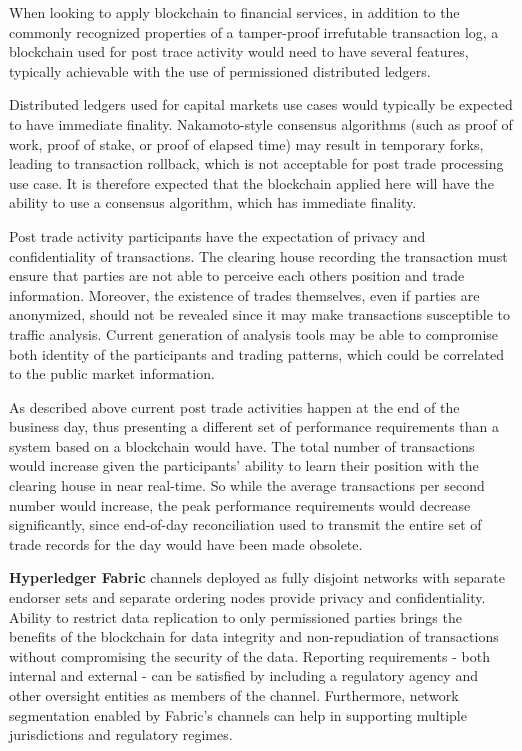 When looking to apply blockchain to financial services, in addition to the commonly recognized properties of a tamper-proof irrefutable transaction log, a blockchain used for post trace activity would need to have several features, typically achievable with the use of permissioned distributed ledgers.

Distributed ledgers used for capital markets use cases would typically be expected to have immediate finality. Nakamoto-style consensus algorithms (such as proof of work, proof of stake, or proof of elapsed time) may result in temporary forks, leading to transaction rollback, which is not acceptable for post trade processing use case. It is therefore expected that the blockchain applied here will have the ability to use a consensus algorithm, which has immediate finality.

Post trade activity participants have the expectation of privacy and confidentiality of transactions. The clearing house recording the transaction must ensure that parties are not able to perceive each others position and trade information. Moreover, the existence of trades themselves, even if parties are anonymized, should not be revealed since it may make transactions susceptible to traffic analysis. Current generation of analysis tools may be able to compromise both identity of the participants and trading patterns, which could be correlated to the public market information.

As described above current post trade activities happen at the end of the business day, thus presenting a different set of performance requirements than a system based on a blockchain would have. The total number of transactions would increase given the participants' ability to learn their position with the clearing house in near real-time. So while the average transactions per second number would increase, the peak performance requirements would decrease significantly, since end-of-day reconciliation used to transmit the entire set of trade records for the day would have been made obsolete.

\textbf{Hyperledger Fabric} channels deployed as fully disjoint networks with separate endorser sets and separate ordering nodes provide privacy and confidentiality. Ability to restrict data replication to only permissioned parties brings the benefits of the blockchain for data integrity and non-repudiation of transactions without compromising the security of the data. Reporting requirements - both internal and external - can be satisfied by including a regulatory agency and other oversight entities as members of the channel. Furthermore, network segmentation enabled by Fabric's channels can help in supporting multiple jurisdictions and regulatory regimes.

